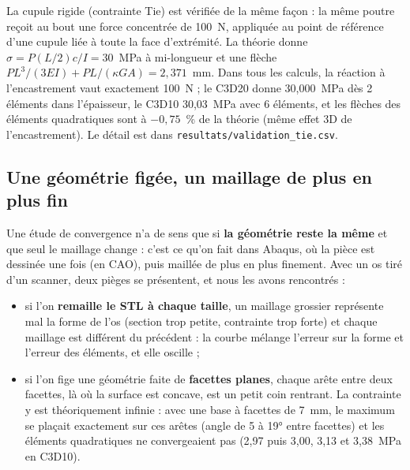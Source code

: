 \documentclass[11pt,a4paper]{article}
\newcommand{\fichier}[1]{\texttt{\small #1}}
\begin{document}
La cupule rigide (contrainte Tie) est vérifiée de la même façon : la même poutre reçoit au bout une force
concentrée de 100~N, appliquée au point de référence d'une cupule liée à toute la face d'extrémité. La théorie donne
$\sigma = P (L/2) c / I = 30$~MPa à mi-longueur et une flèche $P L^3/(3EI) + PL/(\kappa G A) = 2{,}371$~mm. Dans tous les
calculs, la réaction à l'encastrement vaut exactement 100~N ; le C3D20 donne 30,000~MPa dès 2 éléments dans
l'épaisseur, le C3D10 30,03~MPa avec 6 éléments, et les flèches des éléments quadratiques sont à $-0{,}75$~\% de la
théorie (même effet 3D de l'encastrement). Le détail est dans \fichier{resultats/validation\_tie.csv}.

\subsection{Une géométrie figée, un maillage de plus en plus fin}
\label{sec-figee}

Une étude de convergence n'a de sens que si \textbf{la géométrie reste la même} et que seul le maillage change : c'est
ce qu'on fait dans Abaqus, où la pièce est dessinée une fois (en CAO), puis maillée de plus en plus finement. Avec un os
tiré d'un scanner, deux pièges se présentent, et nous les avons rencontrés :
\begin{itemize}
  \item si l'on \textbf{remaille le STL à chaque taille}, un maillage grossier représente mal la forme de l'os (section
  trop petite, contrainte trop forte) et chaque maillage est différent du précédent : la courbe mélange l'erreur sur
  la forme et l'erreur des éléments, et elle oscille ;
  \item si l'on fige une géométrie faite de \textbf{facettes planes}, chaque arête entre deux facettes, là où la surface
  est concave, est un petit coin rentrant. La contrainte y est théoriquement infinie : avec une base à facettes de
  7~mm, le maximum se plaçait exactement sur ces arêtes (angle de 5 à 19° entre facettes) et les éléments quadratiques
  ne convergeaient pas (2,97 puis 3,00, 3,13 et 3,38~MPa en C3D10).
\end{itemize}
\end{document}
